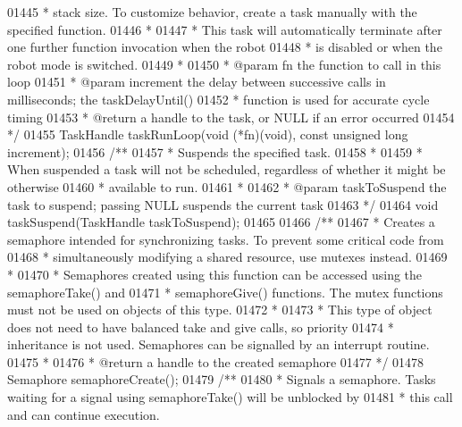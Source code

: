 \begin{DoxyCode}
{{{{{{{{{01445 \textcolor{comment}{ * stack size. To customize behavior, create a task manually with the specified function.}
01446 \textcolor{comment}{ *}
01447 \textcolor{comment}{ * This task will automatically terminate after one further function invocation when the robot}
01448 \textcolor{comment}{ * is disabled or when the robot mode is switched.}
01449 \textcolor{comment}{ *}
01450 \textcolor{comment}{ * @param fn the function to call in this loop}
01451 \textcolor{comment}{ * @param increment the delay between successive calls in milliseconds; the taskDelayUntil()}
01452 \textcolor{comment}{ * function is used for accurate cycle timing}
01453 \textcolor{comment}{ * @return a handle to the task, or NULL if an error occurred}
01454 \textcolor{comment}{ */}
01455 TaskHandle taskRunLoop(\textcolor{keywordtype}{void} (*fn)(\textcolor{keywordtype}{void}), \textcolor{keyword}{const} \textcolor{keywordtype}{unsigned} \textcolor{keywordtype}{long} increment);
01456 \textcolor{comment}{/**}
01457 \textcolor{comment}{ * Suspends the specified task.}
01458 \textcolor{comment}{ *}
01459 \textcolor{comment}{ * When suspended a task will not be scheduled, regardless of whether it might be otherwise}
01460 \textcolor{comment}{ * available to run.}
01461 \textcolor{comment}{ *}
01462 \textcolor{comment}{ * @param taskToSuspend the task to suspend; passing NULL suspends the current task}
01463 \textcolor{comment}{ */}
01464 \textcolor{keywordtype}{void} taskSuspend(TaskHandle taskToSuspend);
01465 
01466 \textcolor{comment}{/**}
01467 \textcolor{comment}{ * Creates a semaphore intended for synchronizing tasks. To prevent some critical code from}
01468 \textcolor{comment}{ * simultaneously modifying a shared resource, use mutexes instead.}
01469 \textcolor{comment}{ *}
01470 \textcolor{comment}{ * Semaphores created using this function can be accessed using the semaphoreTake() and}
01471 \textcolor{comment}{ * semaphoreGive() functions. The mutex functions must not be used on objects of this type.}
01472 \textcolor{comment}{ *}
01473 \textcolor{comment}{ * This type of object does not need to have balanced take and give calls, so priority}
01474 \textcolor{comment}{ * inheritance is not used. Semaphores can be signalled by an interrupt routine.}
01475 \textcolor{comment}{ *}
01476 \textcolor{comment}{ * @return a handle to the created semaphore}
01477 \textcolor{comment}{ */}
01478 Semaphore semaphoreCreate();
01479 \textcolor{comment}{/**}
01480 \textcolor{comment}{ * Signals a semaphore. Tasks waiting for a signal using semaphoreTake() will be unblocked by}
01481 \textcolor{comment}{ * this call and can continue execution.}
}}}}}}}}}
\end{DoxyCode}
